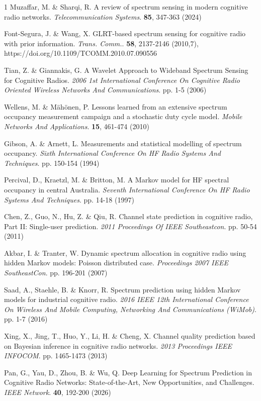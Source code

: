 \documentclass[lettersize,journal]{IEEEtran}
\begin{document}
\begin{thebibliography}{1}
Muzaffar, M. \& Sharqi, R. A review of spectrum sensing in modern cognitive radio networks. {\em Telecommunication Systems}. \textbf{85}, 347-363 (2024)

Font-Segura, J. \& Wang, X. GLRT-based spectrum sensing for cognitive radio with prior information. {\em Trans. Comm.}. \textbf{58}, 2137-2146 (2010,7), https://doi.org/10.1109/TCOMM.2010.07.090556

Tian, Z. \& Giannakis, G. A Wavelet Approach to Wideband Spectrum Sensing for Cognitive Radios. {\em 2006 1st International Conference On Cognitive Radio Oriented Wireless Networks And Communications}. pp. 1-5 (2006)

Wellens, M. \& M{\"a}h{\"o}nen, P. Lessons learned from an extensive spectrum occupancy measurement campaign and a stochastic duty cycle model. {\em Mobile Networks And Applications}. \textbf{15}, 461-474 (2010)

Gibson, A. \& Arnett, L. Measurements and statistical modelling of spectrum occupancy. {\em Sixth International Conference On HF Radio Systems And Techniques}. pp. 150-154 (1994)

Percival, D., Kraetzl, M. \& Britton, M. A Markov model for HF spectral occupancy in central Australia. {\em Seventh International Conference On HF Radio Systems And Techniques}. pp. 14-18 (1997)

Chen, Z., Guo, N., Hu, Z. \& Qiu, R. Channel state prediction in cognitive radio, Part II: Single-user prediction. {\em 2011 Proceedings Of IEEE Southeastcon}. pp. 50-54 (2011)

Akbar, I. \& Tranter, W. Dynamic spectrum allocation in cognitive radio using hidden Markov models: Poisson distributed case. {\em Proceedings 2007 IEEE SoutheastCon}. pp. 196-201 (2007)

Saad, A., Staehle, B. \& Knorr, R. Spectrum prediction using hidden Markov models for industrial cognitive radio. {\em 2016 IEEE 12th International Conference On Wireless And Mobile Computing, Networking And Communications (WiMob)}. pp. 1-7 (2016)

Xing, X., Jing, T., Huo, Y., Li, H. \& Cheng, X. Channel quality prediction based on Bayesian inference in cognitive radio networks. {\em 2013 Proceedings IEEE INFOCOM}. pp. 1465-1473 (2013)

Pan, G., Yau, D., Zhou, B. \& Wu, Q. Deep Learning for Spectrum Prediction in Cognitive Radio Networks: State-of-the-Art, New Opportunities, and Challenges. {\em IEEE Network}. \textbf{40}, 192-200 (2026)


\end{thebibliography}
\end{document}
